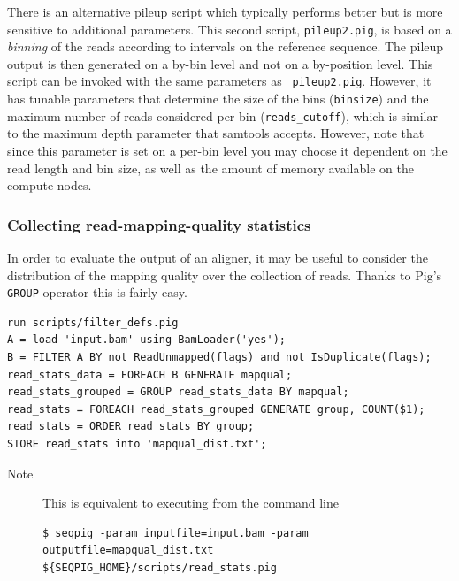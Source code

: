 {There is an alternative pileup script which typically performs better
but is more sensitive to additional parameters. This second script,
{\tt pileup2.pig}, is based on a \emph{binning} of the reads according
to intervals on the reference sequence. The pileup output is then
generated on a by-bin level and not on a by-position level. This
script can be invoked with the same parameters as {\tt
  pileup2.pig}. However, it has tunable parameters that determine the
size of the bins ({\tt binsize}) and the maximum number of reads
considered per bin ({\tt reads\_cutoff}), which is similar to the
maximum depth parameter that samtools accepts. However, note that
since this parameter is set on a per-bin level you may choose it
dependent on the read length and bin size, as well as the amount of
memory available on the compute nodes.

\subsubsection{Collecting read-mapping-quality statistics}
In order to evaluate the output of an aligner, it may be useful to
consider the distribution of the mapping quality over the collection of
reads. Thanks to Pig's {\tt GROUP} operator this is fairly easy.
\begin{lstlisting}
run scripts/filter_defs.pig
A = load 'input.bam' using BamLoader('yes');
B = FILTER A BY not ReadUnmapped(flags) and not IsDuplicate(flags);
read_stats_data = FOREACH B GENERATE mapqual;
read_stats_grouped = GROUP read_stats_data BY mapqual;
read_stats = FOREACH read_stats_grouped GENERATE group, COUNT($1);
read_stats = ORDER read_stats BY group;
STORE read_stats into 'mapqual_dist.txt';
\end{lstlisting}
\begin{description}
	\item[Note] This is equivalent to executing from the command line
\begin{lstlisting}
$ seqpig -param inputfile=input.bam -param outputfile=mapqual_dist.txt ${SEQPIG_HOME}/scripts/read_stats.pig
\end{lstlisting}
\end{description}

}
